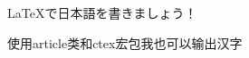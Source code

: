 \documentclass[UTF8]{ctexart}
\begin{document}
\LaTeX で日本語を書きましょう！

使用article类和ctex宏包我也可以输出汉字
\end{document}
